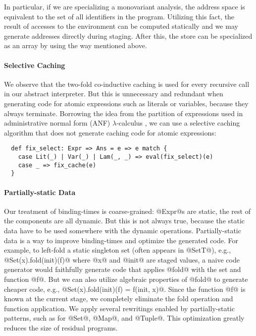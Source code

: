 In particular, if we are specializing a monovariant analysis, the address space
is equivalent to the set of all identifiers in the program. Utilizing this fact, the
result of accesses to the environment can be computed statically and we may
generate addresses directly during staging. After this, the store can be
specialized as an array by using the way mentioned above.

\paragraph{Selective Caching} We observe that the two-fold co-inductive
caching is used for every recursive call in our abstract interpreter. But this
is unnecessary and redundant when generating code for atomic
expressions such as literals or variables, because they always terminate.
Borrowing the idea from the partition of expressions used in 
administrative normal form (ANF) $\lambda$-calculus
\cite{Flanagan:1993:ECC:155090.155113}, we can use a selective caching
algorithm that does not generate caching code for atomic expressions:
\begin{lstlisting}
  def fix_select: Expr => Ans = e => e match {
    case Lit(_) | Var(_) | Lam(_, _) => eval(fix_select)(e)
    case _ => fix_cache(e)
  }
\end{lstlisting}

\paragraph{Partially-static Data}
Our treatment of binding-times is coarse-grained: @Expr@s are static, the rest
of the components are all dynamic. But this is not always true, because the
static data have to be used somewhere with the dynamic operations.
Partially-static data is a way to improve binding-times and optimize the
generated code.
For example, to left-fold a static singleton set (often appears in @SetT@), e.g.,
@Set(x).fold(init)(f)@ where @x@ and @init@ are staged values, a naive code
generator would faithfully generate code that applies @fold@ with the set
and function @f@. But we can also utilize algebraic properties of @fold@
to generate cheaper code, e.g., @Set(x).fold(init)(f) = f(init, x)@. Since the
function @f@ is known at the current stage, we completely eliminate the fold
operation and function application. We apply several rewritings enabled by
partially-static patterns, such as for @Set@, @Map@, and @Tuple@. This
optimization greatly reduces the size of residual programs.

